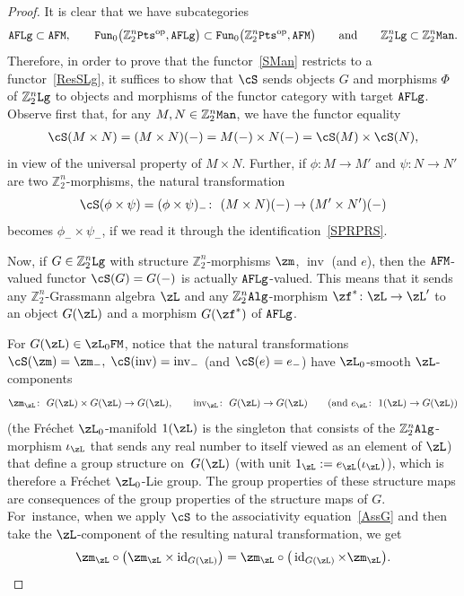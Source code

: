 \documentclass[pdftex]{sigma}%
\newcommand{\op}[1]{\operatorname{#1}}
\newcommand{\Z}{{\mathbb Z}}
\newcommand{\0}{\otimes}
\newcommand{\id}{\op{id}}
\newcommand{\z}{\Z_2^n}
\numberwithin{equation}{section}
\begin{document}
\begin{proof}
It is clear that we have subcategories
\[
{\tt AFLg}\subset{\tt AFM},\qquad {\tt Fun}_0\big(\z{\tt Pts}^{\op{op}},{\tt AFLg}\big)\subset{\tt Fun}_0\big(\z{\tt Pts}^{\op{op}},{\tt AFM}\big)\qquad\text{and}\qquad{\z\tt Lg}\subset\z{\tt Man}.
\]
Therefore, in order to prove that the functor~\eqref{SMan} restricts to a functor~\eqref{ResSLg}, it suffices to show that $\cS$ sends objects $G$ and morphisms $\Phi$ of $\z{\tt Lg}$ to objects and morphisms of the functor category with target ${\tt AFLg}$.
Observe first that, for any $M,N\in\z{\tt Man}$, we have the functor equality
\begin{gather}\label{SPRPRS}
\cS(M\times N)=(M\times N)(-)=M(-)\times N(-)=\cS(M)\times\cS(N),
\end{gather}
in view of the universal property of $M\times N$. Further, if $\phi\colon M\to M'$ and $\psi\colon N\to N'$ are two $\z$-morphisms, the natural transformation
\[
\cS(\phi\times\psi)=(\phi\times\psi)_- \colon\ (M\times N)(-)\to (M'\times N')(-)
\]
 becomes $\phi_-\times\psi_-$, if we read it through the identification~\eqref{SPRPRS}.

Now, if $G\in\z{\tt Lg}$ with structure $\z$-morphisms $\zm$, $\op{inv}$ (and $e$), then the ${\tt AFM}$-valued functor $\cS(G)=G(-)$ is actually ${\tt AFLg}$-valued. This means that it sends any $\z$-Grassmann algebra $\zL$ and any $\z{\tt Alg}$-morphism $\zf^*\colon \zL\to\zL'$ to an object $G(\zL)$ and a morphism $G(\zf^*)$ of $\tt AFLg$.

For $G(\zL)\in\zL_0{\tt FM}$, notice that the natural transformations $\cS(\zm)=\zm_-,\; \cS(\op{inv})=\op{inv}_-$ (and $\cS(e)=e_-$) have $\zL_0$-smooth $\zL$-components
\[
\zm_\zL\colon\ G(\zL)\times G(\zL)\to G(\zL),\qquad \op{inv}_\zL\colon\ G(\zL)\to G(\zL)\qquad(\text{and } e_\zL\colon\ 1(\zL)\to G(\zL))
\]
 (the Fr\'echet $\zL_0$-manifold $1(\zL)$ is the singleton that consists of the $\z{\tt Alg}$-morphism $\iota_\zL$ that sends any real number to itself viewed as an element of $\zL$) that define a group structure on~$G(\zL)$ (with unit $1_\zL:=e_\zL(\iota_\zL)$), which is therefore a Fr\'echet $\zL_0$-Lie group. The group properties of these structure maps are consequences of the group properties of the structure maps of $G$. For~instance, when we apply $\cS$ to the associativity equation~\eqref{AssG} and then take the $\zL$-component of the resulting natural transformation, we get
 \[
 \zm_\zL\circ\big(\zm_\zL\times\id_{G(\zL)}\!\big)=\zm_\zL\circ\big(\id_{G(\zL)}\times\zm_\zL\big).
 \]



\end{proof}
\end{document}
